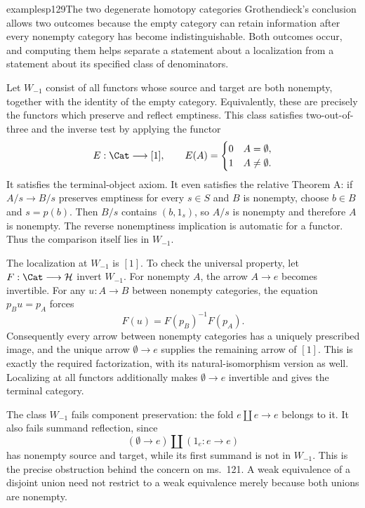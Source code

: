 \begin{dcomment}{examples}{p129}{The two degenerate homotopy categories}
Grothendieck's conclusion allows two outcomes because the empty category can retain information after every nonempty category has become indistinguishable. Both outcomes occur, and computing them helps separate a statement about a localization from a statement about its specified class of denominators.

Let $W_{-1}$ consist of all functors whose source and target are both nonempty, together with the identity of the empty category. Equivalently, these are precisely the functors which preserve and reflect emptiness. This class satisfies two-out-of-three and the inverse test by applying the functor
\[
 E:\Cat\longrightarrow[1],\qquad
 E(A)=\begin{cases}0&A=\emptyset,\\1&A\ne\emptyset.\end{cases}
\]
It satisfies the terminal-object axiom. It even satisfies the relative Theorem A: if $A/s\longrightarrow B/s$ preserves emptiness for every $s\in S$ and $B$ is nonempty, choose $b\in B$ and $s=p(b)$. Then $B/s$ contains $(b,1_s)$, so $A/s$ is nonempty and therefore $A$ is nonempty. The reverse nonemptiness implication is automatic for a functor. Thus the comparison itself lies in $W_{-1}$.

The localization at $W_{-1}$ is $[1]$. To check the universal property, let $F:\Cat\longrightarrow\mathcal H$ invert $W_{-1}$. For nonempty $A$, the arrow $A\longrightarrow e$ becomes invertible. For any $u:A\longrightarrow B$ between nonempty categories, the equation $p_Bu=p_A$ forces
\[
 F(u)=F(p_B)^{-1}F(p_A).
\]
Consequently every arrow between nonempty categories has a uniquely prescribed image, and the unique arrow $\emptyset\longrightarrow e$ supplies the remaining arrow of $[1]$. This is exactly the required factorization, with its natural-isomorphism version as well. Localizing at all functors additionally makes $\emptyset\longrightarrow e$ invertible and gives the terminal category.

The class $W_{-1}$ fails component preservation: the fold $e\amalg e\longrightarrow e$ belongs to it. It also fails summand reflection, since
\[
 (\emptyset\longrightarrow e)\amalg(1_e:e\longrightarrow e)
\]
has nonempty source and target, while its first summand is not in $W_{-1}$. This is the precise obstruction behind the concern on ms.~121. A weak equivalence of a disjoint union need not restrict to a weak equivalence merely because both unions are nonempty.


\end{dcomment}
